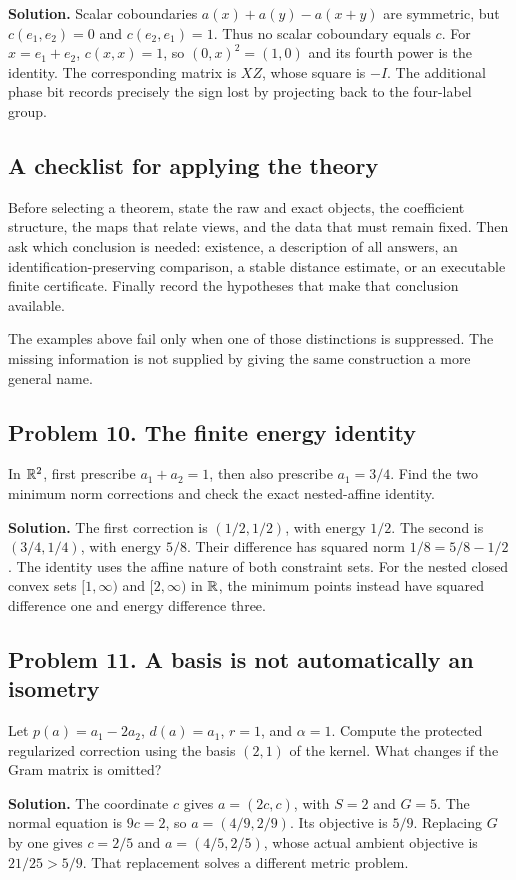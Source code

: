 \textbf{Solution.} Scalar coboundaries $a(x)+a(y)-a(x+y)$ are symmetric, but $c(e_1,e_2)=0$ and $c(e_2,e_1)=1$. Thus no scalar coboundary equals $c$. For $x=e_1+e_2$, $c(x,x)=1$, so $(0,x)^2=(1,0)$ and its fourth power is the identity. The corresponding matrix is $XZ$, whose square is $-I$. The additional phase bit records precisely the sign lost by projecting back to the four-label group.

\subsection*{A checklist for applying the theory}
Before selecting a theorem, state the raw and exact objects, the coefficient structure, the maps that relate views, and the data that must remain fixed. Then ask which conclusion is needed: existence, a description of all answers, an identification-preserving comparison, a stable distance estimate, or an executable finite certificate. Finally record the hypotheses that make that conclusion available.

The examples above fail only when one of those distinctions is suppressed. The missing information is not supplied by giving the same construction a more general name.

\subsection*{Problem 10. The finite energy identity}
In $\mathbb R^2$, first prescribe $a_1+a_2=1$, then also prescribe $a_1=3/4$. Find the two minimum norm corrections and check the exact nested-affine identity.

\textbf{Solution.} The first correction is $(1/2,1/2)$, with energy $1/2$. The second is $(3/4,1/4)$, with energy $5/8$. Their difference has squared norm $1/8=5/8-1/2$. The identity uses the affine nature of both constraint sets. For the nested closed convex sets $[1,\infty)$ and $[2,\infty)$ in $\mathbb R$, the minimum points instead have squared difference one and energy difference three.

\subsection*{Problem 11. A basis is not automatically an isometry}
Let $p(a)=a_1-2a_2$, $d(a)=a_1$, $r=1$, and $\alpha=1$. Compute the protected regularized correction using the basis $(2,1)$ of the kernel. What changes if the Gram matrix is omitted?

\textbf{Solution.} The coordinate $c$ gives $a=(2c,c)$, with $S=2$ and $G=5$. The normal equation is $9c=2$, so $a=(4/9,2/9)$. Its objective is $5/9$. Replacing $G$ by one gives $c=2/5$ and $a=(4/5,2/5)$, whose actual ambient objective is $21/25>5/9$. That replacement solves a different metric problem.

